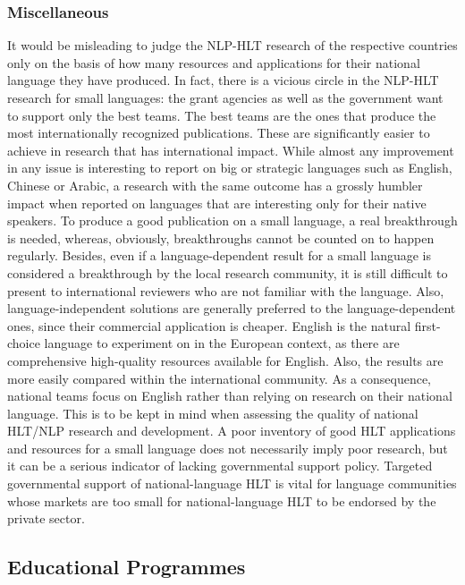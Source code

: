 \begin{multicols}{2}
\subsubsection{Miscellaneous}

It would be misleading to judge the NLP-HLT research of the respective countries only on the basis of how many resources and applications for their national language they have produced. In fact, there is a vicious circle in the NLP-HLT research for small languages: the grant agencies as well as the government want to support only the best teams. The best teams are the ones that produce the most internationally recognized publications. These are significantly easier to achieve in research that has international impact. While almost any improvement in any issue is interesting to report on big or strategic languages such as English, Chinese or Arabic, a research with the same outcome has a grossly humbler impact when reported on languages that are interesting only for their native speakers. To produce a good publication on a small language, a real breakthrough is needed, whereas, obviously, breakthroughs cannot be counted on to happen regularly.  Besides, even if a language-dependent result for a small language is considered a breakthrough by the local research community, it is still difficult to present to international reviewers who are not familiar with the language.
Also, language-independent solutions are generally preferred to the language-dependent ones, since their commercial application is cheaper. English is the natural first-choice language to experiment on in the European context, as there are comprehensive high-quality resources available for English. Also, the results are more easily compared within the international community.
As a consequence, national teams focus on English rather than relying on research on their national language. This is to be kept in mind when assessing the quality of national HLT/NLP research and development. A poor inventory of good HLT applications and resources for a small language does not necessarily imply poor research, but it can be a serious indicator of lacking governmental support policy. Targeted governmental support of national-language HLT is vital for language communities whose markets are too small for national-language HLT to be endorsed by the private sector.
 
\subsection{Educational Programmes}


\end{multicols}
